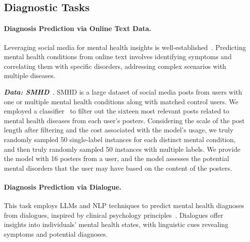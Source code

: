 \subsection{Diagnostic Tasks}
    
\paragraph*{Diagnosis Prediction via Online Text Data.} Leveraging social media for mental health insights is well-established~\citep{chancellor2020methods, culotta2014estimating}. Predicting mental health conditions from online text involves identifying symptoms and correlating them with specific disorders, addressing complex scenarios with multiple diseases.

\textbf{\textit{Data: SMHD}}~\citep{cohan-etal-2018-smhd}. SMHD is a large dataset of social media posts from users with one or multiple mental health conditions along with matched control users. We employed a classifier~\citep{zhang-etal-2022-symptom} to filter out the sixteen most relevant posts related to mental health diseases from each user's posters. Considering the scale of the post length after filtering and the cost associated with the model's usage, we truly randomly sampled 50 single-label instances for each distinct mental condition, and then truly randomly sampled 50 instances with multiple labels. We provide the model with 16 posters from a user, and the model assesses the potential mental disorders that the user may have based on the content of the posters. 

\paragraph*{Diagnosis Prediction via Dialogue.} This task employs LLMs and NLP techniques to predict mental health diagnoses from dialogues, inspired by clinical psychology principles~\citep{pacheco-lorenzo2021smart}. Dialogues offer insights into individuals' mental health states, with linguistic cues revealing symptoms and potential diagnoses.

